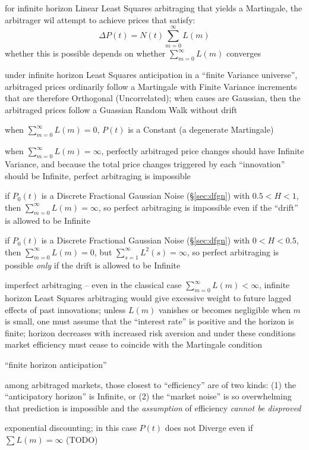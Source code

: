 for infinite horizon Linear Least Squares arbitraging that yields a Martingale,
the arbitrager wil attempt to achieve prices that satisfy:
\[
  \Delta P(t) = N(t) \sum_{m=0}^\infty L(m)
\]
whether this is possible depends on whether $\sum_{m=0}^\infty L(m)$ converges

under infinite horizon Least Squares anticipation in a ``finite Variance
universe'', arbitraged prices ordinarily follow a Martingale with Finite
Variance increments that are therefore Orthogonal (Uncorrelated); when caues are
Gaussian, then the arbitraged prices follow a Guassian Random Walk without drift

when $\sum_{m=0}^\infty L(m) = 0$, $P(t)$ is a Constant (a degenerate
Martingale)

when $\sum_{m=0}^\infty L(m) = \infty$, perfectly arbitraged price changes
should have Infinite Variance, and because the total price changes triggered by
each ``innovation'' should be Infinite, perfect arbitraging is impossible

if $P_0(t)$ is a Discrete Fractional Gaussian Noise (\S\ref{sec:dfgn}) with
$0.5 < H < 1$, then $\sum_{m=0}^\infty L(m) = \infty$, so perfect arbitraging is
impossible even if the ``drift'' is allowed to be Infinite

if $P_0(t)$ is a Discrete Fractional Gaussian Noise (\S\ref{sec:dfgn}) with
$0 < H < 0.5$, then $\sum_{m=0}^\infty L(m) = 0$, but
$\sum_{s=1}^\infty L^2(s) = \infty$, so perfect arbitraging is possible
\emph{only} if the drift is allowed to be Infinite

imperfect arbitraging -- even in the classical case
$\sum_{m=0}^\infty L(m) < \infty$, infinite horizon Least Squares arbitraging
would give excessive weight to future lagged effects of past innovations; unless
$L(m)$ vanishes or becomes negligible when $m$ is small, one must assume that
the ``interest rate'' is positive and the horizon is finite; horizon decreases
with increased risk aversion and under these conditions market efficiency must
cease to coincide with the Martingale condition

``finite horizon anticipation''

among arbitraged markets, those closest to ``efficiency'' are of two kinds: (1)
the ``anticipatory horizon'' is Infinite, or (2) the ``market noise'' is so
overwhelming that prediction is impossible and the \emph{assumption} of
efficiency \emph{cannot be disproved}

exponential discounting; in this case $P(t)$ does not Diverge even if
$\sum L(m) = \infty$ (TODO)

